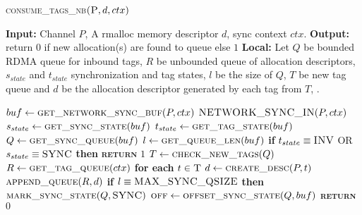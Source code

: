 \documentclass[10pt]{article}
\begin{document}
\begin{algorithm}{}
\footnotesize
\caption{\textsc{consume\_tags\_nb}{$\textsc{(P}, d, ctx)$}}
\label{alg:cons_tags} 
\begin{algorithmic}[1]

\STATE \textbf{Input:} Channel $P$, A rmalloc memory descriptor $d$, sync context $ctx$.
\STATE \textbf{Output:} return {$0$} if new allocation(s) are found to queue else {$1$}
\STATE \textbf{Local:} Let $Q$ be bounded RDMA queue for inbound tags, $R$ be unbounded queue of allocation descriptors, $s_{state}$ and $t_{state}$ synchronization and tag states, $l$ be the size of $Q$, $T$ be new tag queue and $d$ be the allocation descriptor generated by each tag from $T$, .

\STATE $\textbf{$buf$} \leftarrow  \textsc{get\_network\_sync\_buf}(P, ctx)$ 
\STATE $\textsc{NETWORK\_SYNC\_IN}(P, ctx)$ 
\STATE $\textbf{$s_{state}$} \leftarrow  \textsc{get\_sync\_state}(buf)$ 
\STATE $\textbf{$t_{state}$} \leftarrow  \textsc{get\_tag\_state}(buf)$ 
\STATE $\textbf{$Q$} \leftarrow  \textsc{get\_sync\_queue}(buf)$
\STATE $\textbf{$l$} \leftarrow  \textsc{get\_queue\_len}(buf)$ 
\STATE \textbf{if} $t_{state} \equiv \textsc{INV}$ OR $s_{state} \equiv \textsc{SYNC}$ \textbf{then} 
\STATE \quad \textsc{\textbf{return}} {$1$}
\STATE $\textbf{$T$} \leftarrow \textsc{check\_new\_tags}(Q)$
\STATE $\textbf{$R$} \leftarrow  \textsc{get\_tag\_queue}(ctx)$ 
\STATE \textbf{for each} $t \in \textsc{T}$
\STATE \quad $\textbf{$d$} \leftarrow  \textsc{create\_desc}(P, t)$
\STATE \quad $\textsc{append\_queue}(R, d)$
\STATE \textbf{if} $l \equiv \textsc{MAX\_SYNC\_QSIZE}$  \textbf{then} 
\STATE \quad  $\textsc{mark\_sync\_state}(Q, \textsc{SYNC})$
\STATE \quad  $\textsc{off} \leftarrow \textsc{offset\_sync\_state}(Q, buf)$
\STATE {}
\STATE \textsc{\textbf{return}} {$0$}
\STATE


\end{algorithmic}
\end{algorithm}
\end{document}
